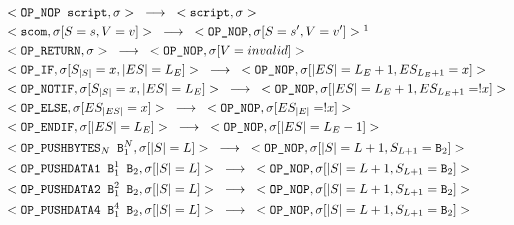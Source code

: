 \documentclass{article}
\begin{document}
\begin{align*}
&<\texttt{OP\_NOP script}, \sigma> \hspace{3mm}
	\longrightarrow \hspace{3mm}
	<\texttt{script}, \sigma> \\
&<\texttt{scom}, \sigma[S=s, V=v]> \hspace{3mm}
	\longrightarrow \hspace{3mm}
	<\texttt{OP\_NOP}, \sigma[S=s', V=v']>\footnotemark \\
&<\texttt{OP\_RETURN}, \sigma> \hspace{3mm}
	\longrightarrow \hspace{3mm}
	<\texttt{OP\_NOP}, \sigma[V = invalid]> \\
&<\texttt{OP\_IF}, \sigma[S_{|S|}=x, |ES|=L_E]> \hspace{3mm}
	\longrightarrow \hspace{3mm}
	<\texttt{OP\_NOP}, \sigma[|ES|=L_{E}+1, ES_{L_E+1}=x]>\\
&<\texttt{OP\_NOTIF}, \sigma[S_{|S|}=x, |ES|=L_E]> \hspace{3mm}
	\longrightarrow \hspace{3mm}
	<\texttt{OP\_NOP}, \sigma[|ES|=L_{E}+1, ES_{L_E+1}=!x]>\\
&<\texttt{OP\_ELSE}, \sigma[ES_{|ES|}=x]> \hspace{3mm}
	\longrightarrow \hspace{3mm}
	<\texttt{OP\_NOP}, \sigma[ES_{|E|}=!x]>\\	
&<\texttt{OP\_ENDIF}, \sigma[|ES|=L_E]> \hspace{3mm}
	\longrightarrow \hspace{3mm}
	<\texttt{OP\_NOP}, \sigma[|ES|=L_{E}-1]>\\
&<\texttt{OP\_PUSHBYTES$_N$ B$_1^N$}, \sigma[|S|=L]> \hspace{3mm}
	\longrightarrow \hspace{3mm}
	<\texttt{OP\_NOP}, \sigma[|S|=L+1, S_{L+1}=\texttt{B}_2]>\\
&<\texttt{OP\_PUSHDATA1 B$_1^1$ B$_2$}, \sigma[|S|=L]> \hspace{3mm}
	\longrightarrow \hspace{3mm}
	<\texttt{OP\_NOP}, \sigma[|S|=L+1, S_{L+1}=\texttt{B}_2]>\\
&<\texttt{OP\_PUSHDATA2 B$_1^2$ B$_2$}, \sigma[|S|=L]> \hspace{3mm}
	\longrightarrow \hspace{3mm}
	<\texttt{OP\_NOP}, \sigma[|S|=L+1, S_{L+1}=\texttt{B}_2]>\\
&<\texttt{OP\_PUSHDATA4 B$_1^4$ B$_2$}, \sigma[|S|=L]> \hspace{3mm}
	\longrightarrow \hspace{3mm}
	<\texttt{OP\_NOP}, \sigma[|S|=L+1, S_{L+1}=\texttt{B}_2]>\\
\end{align*}
\end{document}
